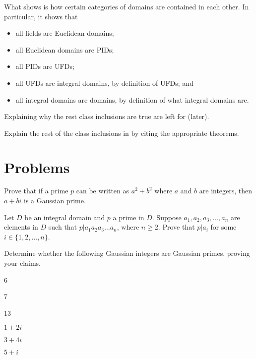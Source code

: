 What  shows is how certain categories of domains are contained in each other. In particular, it shows that
\begin{itemize}
    \item all fields are Euclidean domains;
    \item all Euclidean domains are PIDs;
    \item all PIDs are UFDs;
    \item all UFDs are integral domains, by definition of UFDs; and
    \item all integral domains are domains, by definition of what integral domains are.
\end{itemize}
Explaining why the rest class inclusions are true are left for  (later).

\begin{exercise}\label{exercise-domain-class-inclusion}
    Explain the rest of the class inclusions in  by citing the appropriate theorems.
\end{exercise}

\newpage

\section{Problems}
\begin{problem}
    Prove that if a prime $p$ can be written as $a^2+b^2$ where $a$ and $b$ are integers, then $a+bi$ is a Gaussian prime.
\end{problem}

\begin{problem}\label{problem-prime-element-divides-some-element-in-product}
    Let $D$ be an integral domain and $p$ a prime in $D$. Suppose $a_1, a_2, a_3, \dots, a_n$ are elements in $D$ such that $p \vert a_1a_2a_3\dots a_n$, where $n \geq 2$. Prove that $p \vert a_i$ for some $i \in \{1, 2, \dots, n\}$.
\end{problem}

\begin{problem}
    Determine whether the following Gaussian integers are Gaussian primes, proving your claims.
    \begin{multicols}{3}
        \begin{partquestions}{\alph*}
            \item 6
            \item 7
            \item 13
            \item $1+2i$
            \item $3+4i$
            \item $5+i$
        \end{partquestions}
    \end{multicols}
\end{problem}

